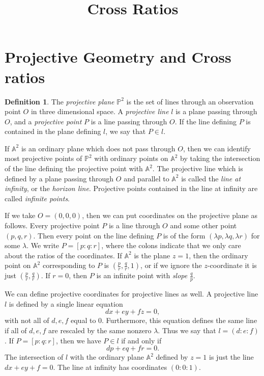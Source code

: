 \documentclass[letterpaper,11pt]{article}
\theoremstyle{definition}
\newtheorem{defn}{Definition}
\theoremstyle{remark}
\begin{document}
\newcommand{\CC}{\mathbb{C}}
\newcommand{\RR}{\mathbb{R}}
\newcommand{\ZZ}{\mathbb{Z}}
\newcommand{\PP}{\mathbb{P}}
\newcommand{\fish}{\reflectbox{$\alpha$}}
\newcommand{\Bl}{\text{\rm Bl}}
\newcommand{\PGL}{\text{\rm PGL}}

\title{Cross Ratios}
\date{}
\maketitle

\tableofcontents

\section{Projective Geometry and Cross ratios}

\begin{defn} The \emph{projective plane} $\mathbb{P}^2$ is the set of lines through an observation point $O$ in three dimensional space. A \emph{projective line} $l$ is a plane passing through $O$, and a \emph{projective point} $P$ is a line passing through $O$. If the line defining $P$ is contained in the plane defining $l$, we say that $P\in l$.
\end{defn}

If $\mathbb{A}^2$ is an ordinary plane which does not pass through $O$, then we can identify most projective points of $\mathbb{P}^2$ with ordinary points on $\mathbb{A}^2$ by taking the intersection of the line defining the projective point with $\mathbb{A}^2$. The projective line which is defined by a plane passing through $O$ and parallel to $\mathbb{A}^2$ is called the \emph{line at infinity}, or the \emph{horizon line}. Projective points contained in the line at infinity are called \emph{infinite points}.

If we take $O = (0,0,0)$, then we can put coordinates on the projective plane as follows. Every projective point $P$ is a line through $O$ and some other point $(p,q,r)$. Then every point on the line defining $P$ is of the form $(\lambda p,\lambda q,\lambda r)$ for some $\lambda$. We write $P = [p:q:r]$, where the colons indicate that we only care about the ratios of the coordinates. If $\mathbb{A}^2$ is the plane $z=1$, then the ordinary point on $\mathbb{A}^2$ corresponding to $P$ is $(\frac{p}{r},\frac{q}{r},1)$, or if we ignore the $z$-coordinate it is just $(\frac{p}{r},\frac{q}{r})$. If $r = 0$, then $P$ is an infinite point with \emph{slope} $\frac{q}{p}$.

We can define projective coordinates for projective lines as well. A projective line $l$ is defined by a single linear equation
\[
dx+ey+fz = 0,
\]
with not all of $d,e,f$ equal to $0$. Furthermore, this equation defines the same line if all of $d,e,f$ are rescaled by the same nonzero $\lambda$. Thus we say that $l = (d:e:f)$. If $P = [p:q:r]$, then we have $P\in l$ if and only if
\[
dp + eq+ fr = 0.
\]
The intersection of $l$ with the ordinary plane $\mathbb{A}^2$ defined by $z=1$ is just the line $dx+ey+f=0$. The line at infinity has coordinates $(0:0:1)$.
\end{document}
